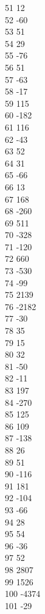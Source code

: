 { 51	12 \\
 52	-60 \\
 53	51 \\
 54	29 \\
 55	-76 \\
 56	51 \\
 57	-63 \\
 58	-17 \\
 59	115 \\
 60	-182 \\
 61	116 \\
 62	-43 \\
 63	52 \\
 64	31 \\
 65	-66 \\
 66	13 \\
 67	168 \\
 68	-260 \\
 69	511 \\
 70	-328 \\
 71	-120 \\
 72	660 \\
 73	-530 \\
 74	-99 \\
 75	2139 \\
 76	-2182 \\
 77	-30 \\
 78	35 \\
 79	15 \\
 80	32 \\
 81	-50 \\
 82	-11 \\
 83	197 \\
 84	-270 \\
 85	125 \\
 86	109 \\
 87	-138 \\
 88	26 \\
 89	51 \\
 90	-116 \\
 91	181 \\
 92	-104 \\
 93	-66 \\
 94	28 \\
 95	54 \\
 96	-36 \\
 97	52 \\
 98	2807 \\
 99	1526 \\
 100	-4374 \\
 101	-29 \\
}
